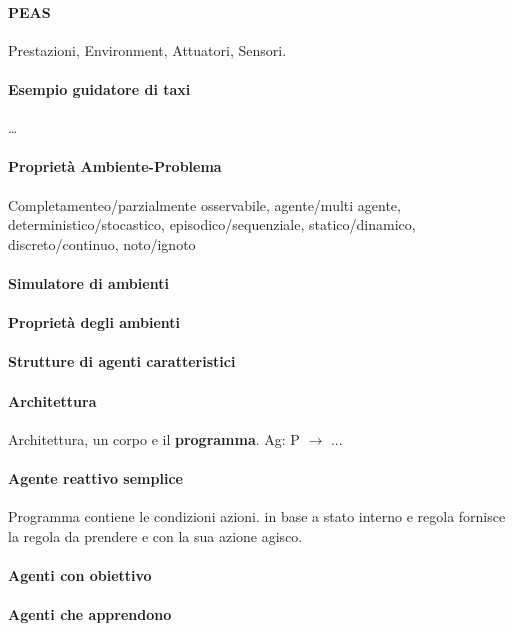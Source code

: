 \documentclass[10pt]{book}
\begin{document}
\paragraph{PEAS} Prestazioni, Environment, Attuatori, Sensori.
\paragraph{Esempio guidatore di taxi} \ldots
\paragraph{Proprietà Ambiente-Problema} Completamenteo/parzialmente osservabile, agente/multi agente, deterministico/stocastico, episodico/sequenziale, statico/dinamico, discreto/continuo, noto/ignoto
\paragraph{Simulatore di ambienti}
\paragraph{Proprietà degli ambienti}
\paragraph{Strutture di agenti caratteristici}
\paragraph{Architettura} Architettura, un corpo e il \textbf{programma}. Ag: P $\longrightarrow$ ...
\paragraph{Agente reattivo semplice} Programma contiene le condizioni azioni. in base a stato interno e regola fornisce la regola da prendere e con la sua azione agisco.
\paragraph{Agenti con obiettivo}
\paragraph{Agenti che apprendono}
\end{document}
